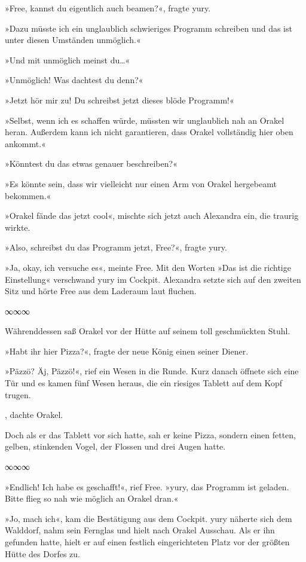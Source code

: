 »Free, kannst du eigentlich auch beamen?«, fragte yury.

»Dazu müsste ich ein unglaublich schwieriges Programm schreiben und das ist unter diesen Umständen unmöglich.«

»Und mit unmöglich meinst du…«

»Unmöglich! Was dachtest du denn?«

»Jetzt hör mir zu! Du schreibst jetzt dieses blöde Programm!«

»Selbst, wenn ich es schaffen würde, müssten wir unglaublich nah an Orakel heran. Außerdem kann ich nicht garantieren, dass Orakel vollständig hier oben ankommt.«

»Könntest du das etwas genauer beschreiben?«

»Es könnte sein, dass wir vielleicht nur einen Arm von Orakel hergebeamt bekommen.«

»Orakel fände das jetzt cool«, mischte sich jetzt auch Alexandra ein, die traurig wirkte.

»Also, schreibst du das Programm jetzt, Free?«, fragte yury.

»Ja, okay, ich versuche es«, meinte Free. Mit den Worten »Das ist die richtige Einstellung« verschwand yury im Cockpit. Alexandra setzte sich auf den zweiten Sitz und hörte Free aus dem Laderaum laut fluchen.

\begin{center}
    ∞∞∞
\end{center}

Währenddessen saß Orakel vor der Hütte auf seinem toll geschmückten Stuhl.

»Habt ihr hier Pizza?«, fragte der neue König einen seiner Diener.

»Päzzö? Äj, Päzzö!«, rief ein Wesen in die Runde. Kurz danach öffnete sich eine Tür und es kamen fünf Wesen heraus, die ein riesiges Tablett auf dem Kopf trugen.

, dachte Orakel.

Doch als er das Tablett vor sich hatte, sah er keine Pizza, sondern einen fetten, gelben, stinkenden Vogel, der Flossen und drei Augen hatte.

\begin{center}
    ∞∞∞
\end{center}

»Endlich! Ich habe es geschafft!«, rief Free. »yury, das Programm ist geladen. Bitte flieg so nah wie möglich an Orakel dran.«

»Jo, mach ich«, kam die Bestätigung aus dem Cockpit. yury näherte sich dem Walddorf, nahm sein Fernglas und hielt nach Orakel Ausschau. Als er ihn gefunden hatte, hielt er auf einen festlich eingerichteten Platz vor der größten Hütte des Dorfes zu.

